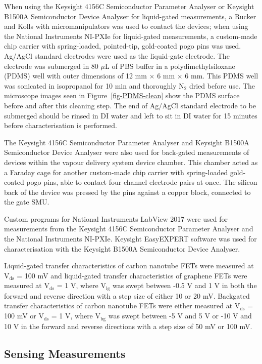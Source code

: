 \documentclass[
  a4paper,
]{scrbook}
\begin{document}
When using the Keysight 4156C Semiconductor Parameter Analyser or
Keysight B1500A Semiconductor Device Analyser for liquid-gated
measurements, a Rucker and Kolls with micromanipulators was used to
contact the devices; when using the National Instruments NI-PXIe for
liquid-gated measurements, a custom-made chip carrier with
spring-loaded, pointed-tip, gold-coated pogo pins was used. Ag/AgCl
standard electrodes were used as the liquid-gate electrode. The
electrode was submerged in 80 \(\mu\)L of PBS buffer in a
polydimethylsiloxane (PDMS) well with outer dimensions of 12 mm
\(\times\) 6 mm \(\times\) 6 mm. This PDMS well was sonicated in
isopropanol for 10 min and thoroughly N\(_2\) dried before use. The
microscope images seen in Figure~\ref{fig-PDMS-clean} show the PDMS
surface before and after this cleaning step. The end of Ag/AgCl standard
electrode to be submerged should be rinsed in DI water and left to sit
in DI water for 15 minutes before characterisation is performed.

The Keysight 4156C Semiconductor Parameter Analyser and Keysight B1500A
Semiconductor Device Analyser were also used for back-gated measurements
of devices within the vapour delivery system device chamber. This
chamber acted as a Faraday cage for another custom-made chip carrier
with spring-loaded gold-coated pogo pins, able to contact four channel
electrode pairs at once. The silicon back of the device was pressed by
the pins against a copper block, connected to the gate SMU.

Custom programs for National Instruments LabView 2017 were used for
measurements from the Keysight 4156C Semiconductor Parameter Analyser
and the National Instruments NI-PXIe. Keysight EasyEXPERT software was
used for characterisation with the Keysight B1500A Semiconductor Device
Analyser.

Liquid-gated transfer characteristics of carbon nanotube FETs were
measured at V\(_{\mathrm{ds}}\) = 100 mV and liquid-gated transfer
characteristics of graphene FETs were measured at V\(_{\mathrm{ds}}\) =
1 V, where V\(_{\mathrm{lg}}\) was swept between -0.5 V and 1 V in both
the forward and reverse direction with a step size of either 10 or 20
mV. Backgated transfer characteristics of carbon nanotube FETs were
either measured at V\(_{\mathrm{ds}}\) = 100 mV or V\(_{\mathrm{ds}}\) =
1 V, where V\(_{\mathrm{bg}}\) was swept between -5 V and 5 V or -10 V
and 10 V in the forward and reverse directions with a step size of 50 mV
or 100 mV.

\hypertarget{sensing-measurements}{%
\subsection{Sensing Measurements}\label{sensing-measurements}}
\end{document}
